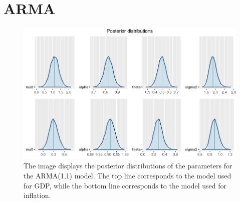 \chapter{ARMA}
\label{ARMA}

\begin{figure}[h]
    \centering
    \includegraphics[width=\textwidth]{../Images/4-ARMA/posteriors.png}
    \caption{The image displays the posterior distributions of the parameters for the ARMA(1,1) model. The top line corresponds to the model used for GDP, while the bottom line corresponds to the model used for inflation.}
    \label{fig:ARMA_posteriors}
\end{figure}

